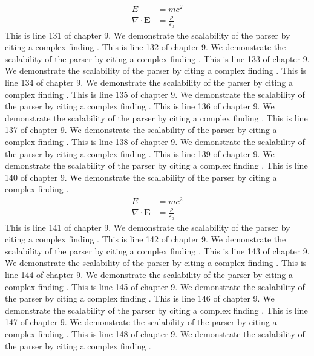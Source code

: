 \begin{align*}
  E &= mc^2 \\
  \nabla \cdot \mathbf{E} &= \frac{\rho}{\varepsilon_0}
\end{align*}
This is line 131 of chapter 9. We demonstrate the scalability of the parser by citing a complex finding \cite{ref9_131}.
This is line 132 of chapter 9. We demonstrate the scalability of the parser by citing a complex finding \cite{ref9_132}.
This is line 133 of chapter 9. We demonstrate the scalability of the parser by citing a complex finding \cite{ref9_133}.
This is line 134 of chapter 9. We demonstrate the scalability of the parser by citing a complex finding \cite{ref9_134}.
This is line 135 of chapter 9. We demonstrate the scalability of the parser by citing a complex finding \cite{ref9_135}.
This is line 136 of chapter 9. We demonstrate the scalability of the parser by citing a complex finding \cite{ref9_136}.
This is line 137 of chapter 9. We demonstrate the scalability of the parser by citing a complex finding \cite{ref9_137}.
This is line 138 of chapter 9. We demonstrate the scalability of the parser by citing a complex finding \cite{ref9_138}.
This is line 139 of chapter 9. We demonstrate the scalability of the parser by citing a complex finding \cite{ref9_139}.
This is line 140 of chapter 9. We demonstrate the scalability of the parser by citing a complex finding \cite{ref9_140}.
\begin{align*}
  E &= mc^2 \\
  \nabla \cdot \mathbf{E} &= \frac{\rho}{\varepsilon_0}
\end{align*}
This is line 141 of chapter 9. We demonstrate the scalability of the parser by citing a complex finding \cite{ref9_141}.
This is line 142 of chapter 9. We demonstrate the scalability of the parser by citing a complex finding \cite{ref9_142}.
This is line 143 of chapter 9. We demonstrate the scalability of the parser by citing a complex finding \cite{ref9_143}.
This is line 144 of chapter 9. We demonstrate the scalability of the parser by citing a complex finding \cite{ref9_144}.
This is line 145 of chapter 9. We demonstrate the scalability of the parser by citing a complex finding \cite{ref9_145}.
This is line 146 of chapter 9. We demonstrate the scalability of the parser by citing a complex finding \cite{ref9_146}.
This is line 147 of chapter 9. We demonstrate the scalability of the parser by citing a complex finding \cite{ref9_147}.
This is line 148 of chapter 9. We demonstrate the scalability of the parser by citing a complex finding \cite{ref9_148}.
